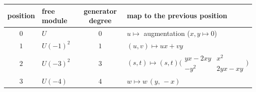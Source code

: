\begin{tabular}{@{}clcl@{}}
\toprule
position & free module & generator degree & map to the previous position\\
\midrule
$0$ & $U$ & $0$ & $u\mapsto$ augmentation ($x,y\mapsto0$)\\
$1$ & $U(-1)^2$ & $1$ & $(u,v)\mapsto ux+vy$\\
$2$ & $U(-3)^2$ & $3$ & $(s,t)\mapsto(s,t)\bigl(\begin{smallmatrix}yx-2xy&x^2\\-y^2&2yx-xy\end{smallmatrix}\bigr)$\\
$3$ & $U(-4)$ & $4$ & $w\mapsto w\,(y,\,-x)$\\
\bottomrule
\end{tabular}
